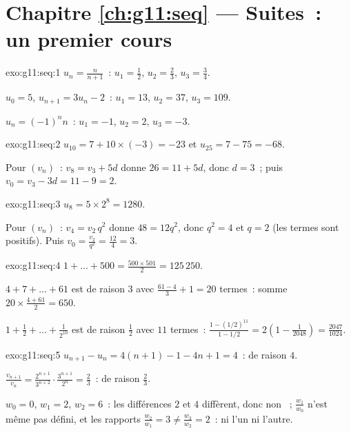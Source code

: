\section*{Chapitre \ref{ch:g11:seq} --- Suites~: un premier cours}

\begin{solution}{exo:g11:seq:1}
$u_n = \frac{n}{n+1}$~: $u_1 = \frac12$, $u_2 = \frac23$,
$u_3 = \frac34$.

$u_0 = 5$, $u_{n+1} = 3u_n - 2$~: $u_1 = 13$, $u_2 = 37$, $u_3 = 109$.

$u_n = (-1)^n n$~: $u_1 = -1$, $u_2 = 2$, $u_3 = -3$.
\end{solution}

\begin{solution}{exo:g11:seq:2}
$u_{10} = 7 + 10 \times (-3) = -23$ et $u_{25} = 7 - 75 = -68$.

Pour $(v_n)$~: $v_8 = v_3 + 5d$ donne $26 = 11 + 5d$, donc $d = 3$~;
puis $v_0 = v_3 - 3d = 11 - 9 = 2$.
\end{solution}

\begin{solution}{exo:g11:seq:3}
$u_8 = 5 \times 2^8 = 1280$.

Pour $(v_n)$~: $v_4 = v_2\, q^2$ donne $48 = 12 q^2$, donc $q^2 = 4$ et
$q = 2$ (les termes sont positifs). Puis
$v_0 = \frac{v_2}{q^2} = \frac{12}{4} = 3$.
\end{solution}

\begin{solution}{exo:g11:seq:4}
$1 + \dots + 500 = \frac{500 \times 501}{2} = 125\,250$.

$4 + 7 + \dots + 61$ est  de raison $3$ avec
$\frac{61 - 4}{3} + 1 = 20$ termes~: somme
$20 \times \frac{4 + 61}{2} = 650$.

$1 + \frac12 + \dots + \frac{1}{2^{10}}$ est  de raison
$\frac12$ avec $11$ termes~:
$\frac{1 - (1/2)^{11}}{1 - 1/2} = 2\left(1 - \frac{1}{2048}\right)
= \frac{2047}{1024}$.
\end{solution}

\begin{solution}{exo:g11:seq:5}
$u_{n+1} - u_n = 4(n+1) - 1 - 4n + 1 = 4$~:  de raison $4$.

$\frac{v_{n+1}}{v_n} = \frac{2^{n+1}}{3^{n+2}} \cdot \frac{3^{n+1}}{2^n}
= \frac23$~:  de raison $\frac23$.

$w_0 = 0$, $w_1 = 2$, $w_2 = 6$~: les différences $2$ et $4$ diffèrent,
donc non ~; $\frac{w_1}{w_0}$ n'est même pas défini, et les
rapports $\frac{w_2}{w_1} = 3 \neq \frac{w_3}{w_2} = 2$~: ni l'un ni
l'autre.
\end{solution}

